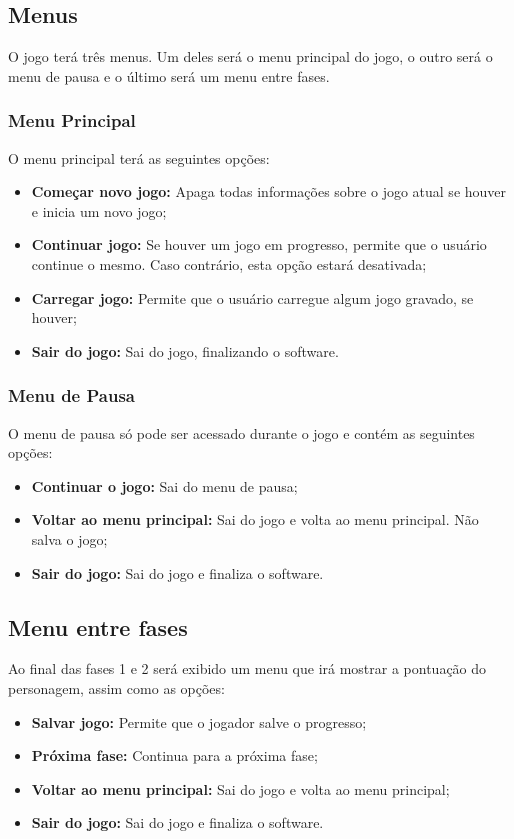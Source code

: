 \subsection{Menus}

O jogo terá três menus. Um deles será o menu principal do jogo, o 
outro será o menu de pausa e o último será um menu entre fases.

\subsubsection{Menu Principal}

O menu principal terá as seguintes opções:
\begin{itemize}
 \item {\bf Começar novo jogo:} Apaga todas informações sobre o jogo atual
se houver e inicia um novo jogo;
 \item {\bf Continuar jogo:} Se houver um jogo em progresso, permite que
o usuário continue o mesmo. Caso contrário, esta opção estará desativada;
 \item {\bf Carregar jogo:} Permite que o usuário carregue algum jogo
gravado, se houver;
 \item {\bf Sair do jogo:} Sai do jogo, finalizando o software.
\end{itemize}

\subsubsection{Menu de Pausa}
O menu de pausa só pode ser acessado durante o jogo e contém as seguintes
opções:
\begin{itemize}
 \item {\bf Continuar o jogo:} Sai do menu de pausa;
 \item {\bf Voltar ao menu principal:} Sai do jogo e volta ao menu 
principal. Não salva o jogo;
 \item {\bf Sair do jogo:} Sai do jogo e finaliza o software.
\end{itemize}

\subsection{Menu entre fases}
Ao final das fases 1 e 2 será exibido um menu que irá mostrar a pontuação do
personagem, assim como as opções:
\begin{itemize}
 \item {\bf Salvar jogo:} Permite que o jogador salve o progresso;
 \item {\bf Próxima fase:} Continua para a próxima fase;
 \item {\bf Voltar ao menu principal:} Sai do jogo e volta ao menu principal;
 \item {\bf Sair do jogo:} Sai do jogo e finaliza o software.
\end{itemize}
